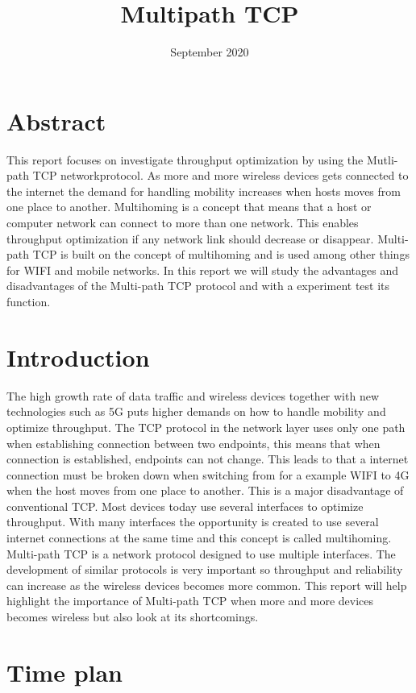 \documentclass{article}
\title{Multipath TCP}
\date{September 2020}
\begin{document}
\maketitle

\newpage
\section{Abstract}

This report focuses on investigate throughput optimization by using the Mutli-path TCP networkprotocol. As more and more wireless devices gets connected to the internet the demand for handling mobility increases when hosts moves from one place to another. Multihoming is a concept that means that a host or computer network can connect to more than one network. This enables throughput optimization if any network link should decrease or disappear. Multi-path TCP is built on the concept of multihoming and is used among other things for WIFI and mobile networks. In this report we will study the advantages and disadvantages of the Multi-path TCP protocol and with a experiment test its function.   



\section{Introduction}

The high growth rate of data traffic and wireless devices together with new technologies such as 5G puts higher demands on how to handle mobility and optimize throughput. 
The TCP protocol in the network layer uses only one path when establishing connection between two endpoints, this means that when connection is established, endpoints can not change. This leads to that a internet connection must be broken down when switching from for a example WIFI to 4G when the host moves from one place to another. This is a major disadvantage of conventional TCP. Most devices today use several interfaces to optimize throughput. With many interfaces the opportunity is created to use several internet connections at the same time and this concept is called multihoming.
Multi-path TCP is a network protocol designed to use multiple interfaces. The development of similar protocols is very important so throughput and reliability can increase as the wireless devices becomes more common.
This report will help highlight the importance of Multi-path TCP when more and more devices becomes wireless but also look at its shortcomings. 

\section{Time plan}
\end{document}
